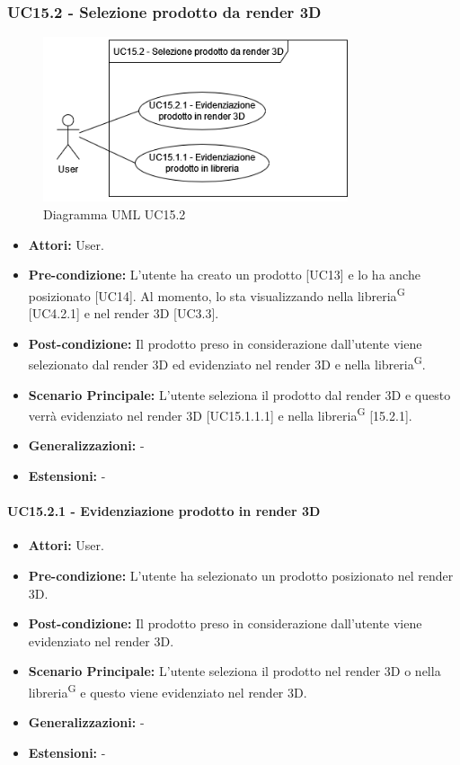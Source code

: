 \subsubsection{UC15.2 - Selezione prodotto da render 3D}
\begin{figure}[H]
  \centering
  \includegraphics[width=0.8\textwidth]{UC_diagrams_11-20/UC15.2.drawio.png}
   \caption{Diagramma UML UC15.2}
\end{figure}
\begin{itemize}
    \item \textbf{Attori:} User.
    \item \textbf{Pre-condizione:} L'utente ha creato un prodotto [UC13] e lo ha anche posizionato [UC14]. Al momento, lo sta visualizzando nella libreria\textsuperscript{G} [UC4.2.1] e nel render 3D [UC3.3].
    \item \textbf{Post-condizione:} Il prodotto preso in considerazione dall'utente viene selezionato dal render 3D ed evidenziato nel render 3D e nella libreria\textsuperscript{G}.
    \item \textbf{Scenario Principale:} L'utente seleziona il prodotto dal render 3D e questo verrà evidenziato nel render 3D [UC15.1.1.1] e nella libreria\textsuperscript{G} [15.2.1].
    \item \textbf{Generalizzazioni:} -
    \item \textbf{Estensioni:} -
\end{itemize}


\paragraph{UC15.2.1 - Evidenziazione prodotto in render 3D}
\begin{itemize}
    \item \textbf{Attori:} User.
    \item \textbf{Pre-condizione:} L'utente ha selezionato un prodotto posizionato nel render 3D.
    \item \textbf{Post-condizione:} Il prodotto preso in considerazione dall'utente viene evidenziato nel render 3D.
    \item \textbf{Scenario Principale:} L'utente seleziona il prodotto nel render 3D o nella libreria\textsuperscript{G} e questo viene evidenziato nel render 3D.
    \item \textbf{Generalizzazioni:} -
    \item \textbf{Estensioni:} -
\end{itemize}


